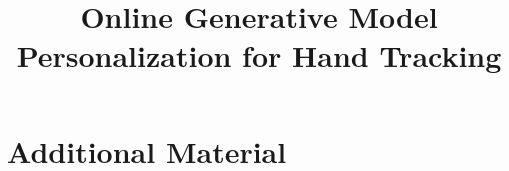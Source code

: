 \documentclass[acmtog, anonymous]{acmart}
\begin{document}
\title{Online Generative Model Personalization for Hand Tracking}

% 


\maketitle




\newpage




\clearpage


\clearpage
\section{Additional Material}

\end{document}
